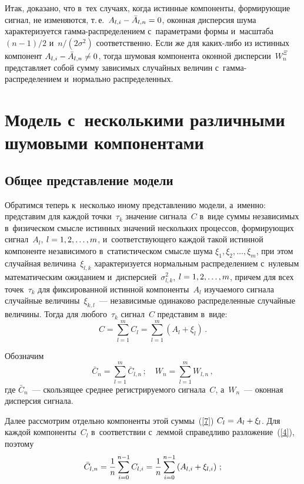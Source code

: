 \begin{multicols}{2}
Итак, доказано, что в~тех случаях, когда истинные компоненты, формирующие 
сигнал, не изменяются, т.\,е.\ $ A_{l,i} \hm- \bar{A}_{l,n} \hm= 0$, 
оконная дис\-пер\-сия шума характеризуется гам\-ма-рас\-пре\-де\-ле\-ни\-ем с~параметрами 
формы и~масштаба~$({n-1})/{2}$  и~${n}/({2\sigma^{2}})$ 
соответственно. Если же для ка\-ких-ли\-бо из истинных компонент  
$ A_{l,i} \hm- \bar{A}_{l,n} \hm\neq 0$, тогда шумовая компонента 
оконной дисперсии~$W_{n}^{\Xi}$ пред\-став\-ля\-ет собой сумму зависимых случайных 
величин с~гам\-ма-рас\-пре\-де\-ле\-ни\-ем и~нормально распределенных.

\section{Модель с~несколькими различными шумовыми компонентами}

\subsection{Общее представление модели}

Обратимся теперь к~несколько иному пред\-став\-ле\-нию модели, а~именно: 
представим для каждой точки~$\tau_{k}$ значение сигнала~$C$ в~виде 
суммы независимых в~физическом смысле истинных значений нескольких процессов, 
формирующих сигнал~$A_{l}$, $l \hm= 1, 2, \ldots, m$, и~соответствующего каждой 
такой истинной компоненте независимого в~статистическом смысле 
шума $\xi_{1}, \xi_{2}, \ldots, \xi_{m}$, при этом случайная величина~$\xi_{l, k} $ 
характеризуется нормальным распреде\-лением с~нулевым математическим 
ожиданием и~дисперсией~$\sigma^{2}_{l, k}$, $l \hm= 1, 2, \ldots , m$, 
причем для всех точек~$\tau_{k}$ для фиксированной истинной компоненты~$A_{l}$ 
изучаемого сигнала случайные величины~$\xi_{k,l}$~--- 
независимые одинаково распределенные случайные величины. Тогда для любого~$\tau_{k}$ 
сигнал~$C$  представим в~виде:
\begin{equation}
\label{7}
C = \sum\limits_{l=1}^{m}C_{l} = \sum\limits_{l=1}^{m}\left( A_{l}+\xi_{l}\right)\,.
\end{equation}

Обозначим
$$
\bar{C}_{n} = \sum\limits_{l=1}^{m} \bar{C}_{l,n}\,; 
\quad W_{n} = \sum\limits_{l=1}^{m} W_{l,n}\,,
$$
где $\bar{C}_{n}$~--- скользящее среднее регистрируемого сигнала~$C$, 
а~$ W_{n}$~--- оконная дисперсия сигнала.

Далее рассмотрим отдельно компоненты этой суммы~(\ref{7}) 
$C_{l}\hm =  A_{l}\hm+\xi_{l}$. Для каждой компоненты~$C_{l}$ 
в~соответствии с~леммой справедливо разложение~(\ref{4}), поэтому
$$
\bar{C}_{l,n}=\displaystyle\frac{\displaystyle 1\mathstrut}{\displaystyle n\mathstrut} \sum\limits_{i=0}^{n-1}C_{l,i} = \displaystyle\frac{\displaystyle 1\mathstrut}{\displaystyle n\mathstrut} 
\sum\limits_{i=0}^{n-1}\left( A_{l,i}+\xi_{l,i}\right)\,;
$$


\end{multicols}
